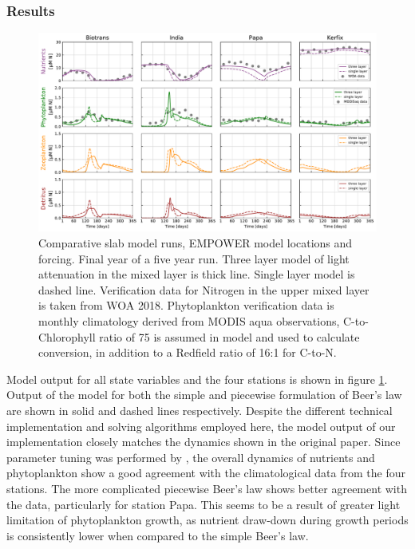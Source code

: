 \documentclass[journal abbreviation, manuscript]{copernicus}
\begin{document}
\subsubsection{Results}
\begin{figure}[t]
\includegraphics[width=15cm]{Figures/firstdraft_plots/02_EMPOWER_lightcomp.pdf}
\caption{Comparative slab model runs, EMPOWER model locations and forcing. Final year of a five year run. Three layer model of light attenuation in the mixed layer is thick line. Single layer model is dashed line. Verification data for Nitrogen in the upper mixed layer is taken from WOA 2018. Phytoplankton verification data is monthly climatology derived from MODIS aqua observations, C-to-Chlorophyll ratio of 75 is assumed in model and used to calculate conversion, in addition to a Redfield ratio of 16:1 for C-to-N.}
\label{Figure:ResultsEMPOWER}
\end{figure}

Model output for all state variables and the four stations is shown in figure \ref{Figure:ResultsEMPOWER}. Output of the model for both the simple and piecewise formulation of Beer's law are shown in solid and dashed lines respectively. 
Despite the different technical implementation and solving algorithms employed here, the model output of our implementation closely matches the dynamics shown in the original paper. Since parameter tuning was performed by \citet{Anderson2015c}, the overall dynamics of nutrients and phytoplankton show a good agreement with the climatological data from the four stations. The more complicated piecewise Beer's law shows better agreement with the data, particularly for station Papa. This seems to be a result of greater light limitation of phytoplankton growth, as nutrient draw-down during growth periods is consistently lower when compared to the simple Beer's law.
\end{document}
